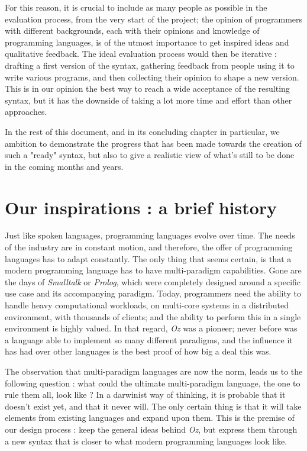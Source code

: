 For this reason, it is crucial to include as many people as possible in the evaluation process, from the very start of the project;
the opinion of programmers with different backgrounds, each with their opinions and knowledge of programming languages, is of the utmost importance to get inspired ideas and qualitative feedback.
The ideal evaluation process would then be iterative : drafting a first version of the syntax, gathering feedback from people using it to write various programs, and then collecting their opinion to shape a new version.
This is in our opinion the best way to reach a wide acceptance of the resulting syntax, but it has the downside of taking a lot more time and effort than other approaches.\newline

In the rest of this document, and in its concluding chapter in particular, we ambition to demonstrate the progress that has been made towards the creation of such a "ready" syntax, but also to give a realistic view of what's still to be done in the coming months and years.

\section{Our inspirations : a brief history}\label{sec:ch1-inspiration}
Just like spoken languages, programming languages evolve over time.
The needs of the industry are in constant motion, and therefore, the offer of programming languages has to adapt constantly.
The only thing that seems certain, is that a modern programming language has to have multi-paradigm capabilities.
Gone are the days of \textit{Smalltalk} or \textit{Prolog}, which were completely designed around a specific use case and its accompanying paradigm.
Today, programmers need the ability to handle heavy computational workloads, on multi-core systems in a distributed environment, with thousands of clients;
and the ability to perform this in a single environment is highly valued.
In that regard, \textit{Oz} was a pioneer;
never before was a language able to implement so many different paradigms, and the influence it has had over other languages is the best proof of how big a deal this was.\newline

The observation that multi-paradigm languages are now the norm, leads us to the following question : what could the ultimate multi-paradigm language, the one to rule them all, look like ?
In a darwinist way of thinking, it is probable that it doesn't exist yet, and that it never will.
The only certain thing is that it will take elements from existing languages and expand upon them.
This is the premise of our design process : keep the general ideas behind \textit{Oz}, but express them through a new syntax that is closer to what modern programming languages look like.

